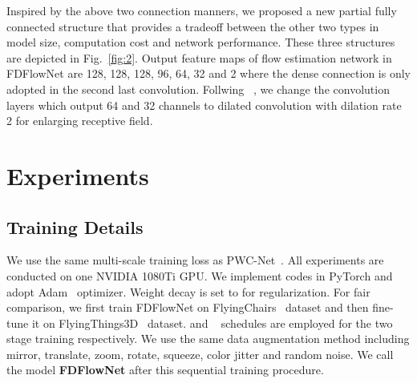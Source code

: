 \documentclass{article}
\begin{document}
Inspired by the above two connection manners, we proposed a new partial fully connected structure that provides a tradeoff between the other two types in model size, computation cost and network performance. These three structures are depicted in Fig.~\ref{fig:2}. Output feature maps of flow estimation network in FDFlowNet are 128, 128, 128, 96, 64, 32 and 2 where the dense connection is only adopted in the second last convolution. Follwing ~\cite{8682229, 8451790}, we change the convolution layers which output 64 and 32 channels to dilated convolution with dilation rate 2 for enlarging receptive field.



\section{Experiments}
\subsection{Training Details}
We use the same multi-scale training loss as PWC-Net~\cite{Sun_2018_CVPR}. All experiments are conducted on one NVIDIA 1080Ti GPU. We implement codes in PyTorch and adopt Adam~\cite{article} optimizer. Weight decay is set to  for regularization. For fair comparison, we first train FDFlowNet on FlyingChairs~\cite{Fischer2015FlowNetLO} dataset and then fine-tune it on FlyingThings3D~\cite{MIFDB16} dataset.  and ~\cite{Ilg2017FlowNet2E} schedules are employed for the two stage training respectively. We use the same data augmentation method including mirror, translate, zoom, rotate, squeeze, color jitter and random noise. We call the model {\bf FDFlowNet} after this sequential training procedure.
\end{document}
